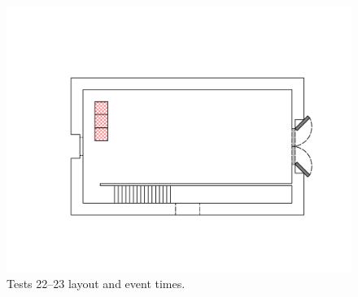\documentclass[12pt,oneside]{book}
\begin{document}
\begin{figure}[!ht]
\begin{minipage}[b]{0.9\columnwidth}
	\includegraphics[width=0.84\columnwidth]{../Figures/Floor_Plans/West_Structure_1st_Floor_Test_22}
\end{minipage}
\caption{Tests 22--23 layout and event times.}
\label{fig:west_test_22}
\end{figure}
\end{document}
